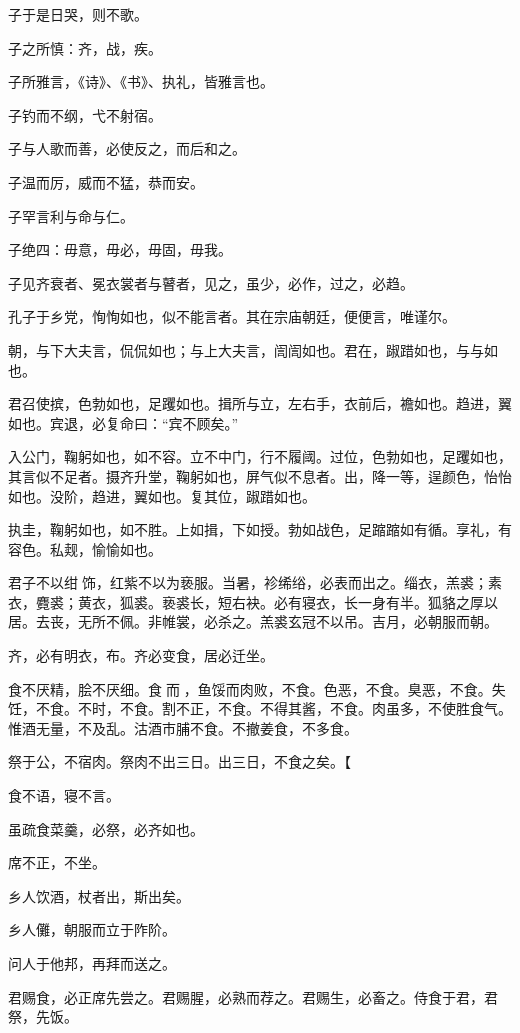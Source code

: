 \documentclass[a5paper]{ctexbook}
\begin{document}
    子于是日哭，则不歌。

    子之所慎：齐，战，疾。

    子所雅言，《诗》、《书》、执礼，皆雅言也。

    子钓而不纲，弋不射宿。

    子与人歌而善，必使反之，而后和之。

    子温而厉，威而不猛，恭而安。

    子罕言利与命与仁。

    子绝四：毋意，毋必，毋固，毋我。

    子见齐衰者、冕衣裳者与瞽者，见之，虽少，必作，过之，必趋。

    孔子于乡党，恂恂如也，似不能言者。其在宗庙朝廷，便便言，唯谨尔。

    朝，与下大夫言，侃侃如也；与上大夫言，訚訚如也。君在，踧踖如也，与与如也。

    君召使摈，色勃如也，足躩如也。揖所与立，左右手，衣前后，襜如也。趋进，翼如也。宾退，必复命曰：“宾不顾矣。”

    入公门，鞠躬如也，如不容。立不中门，行不履阈。过位，色勃如也，足躩如也，其言似不足者。摄齐升堂，鞠躬如也，屏气似不息者。出，降一等，逞颜色，怡怡如也。没阶，趋进，翼如也。复其位，踧踖如也。

    执圭，鞠躬如也，如不胜。上如揖，下如授。勃如战色，足蹜蹜如有循。享礼，有容色。私觌，愉愉如也。

    君子不以绀𮉪饰，红紫不以为亵服。当暑，袗𫄨绤，必表而出之。缁衣，羔裘；素衣，麑裘；黄衣，狐裘。亵裘长，短右袂。必有寝衣，长一身有半。狐貉之厚以居。去丧，无所不佩。非帷裳，必杀之。羔裘玄冠不以吊。吉月，必朝服而朝。

    齐，必有明衣，布。齐必变食，居必迁坐。

    食不厌精，脍不厌细。食𮩞而𮩝，鱼馁而肉败，不食。色恶，不食。臭恶，不食。失饪，不食。不时，不食。割不正，不食。不得其酱，不食。肉虽多，不使胜食气。惟酒无量，不及乱。沽酒市脯不食。不撤姜食，不多食。

    祭于公，不宿肉。祭肉不出三日。出三日，不食之矣。【
    
    食不语，寝不言。
    
    虽疏食菜羹，必祭，必齐如也。

    席不正，不坐。
    
    乡人饮酒，杖者出，斯出矣。
    
    乡人儺，朝服而立于阼阶。
    
    问人于他邦，再拜而送之。

    君赐食，必正席先尝之。君赐腥，必熟而荐之。君赐生，必畜之。侍食于君，君祭，先饭。
\end{document}
